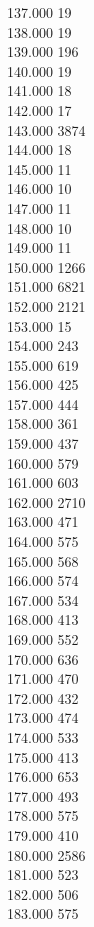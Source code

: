 { 137.000	19 \\
 138.000	19 \\
 139.000	196 \\
 140.000	19 \\
 141.000	18 \\
 142.000	17 \\
 143.000	3874 \\
 144.000	18 \\
 145.000	11 \\
 146.000	10 \\
 147.000	11 \\
 148.000	10 \\
 149.000	11 \\
 150.000	1266 \\
 151.000	6821 \\
 152.000	2121 \\
 153.000	15 \\
 154.000	243 \\
 155.000	619 \\
 156.000	425 \\
 157.000	444 \\
 158.000	361 \\
 159.000	437 \\
 160.000	579 \\
 161.000	603 \\
 162.000	2710 \\
 163.000	471 \\
 164.000	575 \\
 165.000	568 \\
 166.000	574 \\
 167.000	534 \\
 168.000	413 \\
 169.000	552 \\
 170.000	636 \\
 171.000	470 \\
 172.000	432 \\
 173.000	474 \\
 174.000	533 \\
 175.000	413 \\
 176.000	653 \\
 177.000	493 \\
 178.000	575 \\
 179.000	410 \\
 180.000	2586 \\
 181.000	523 \\
 182.000	506 \\
 183.000	575 \\
}
